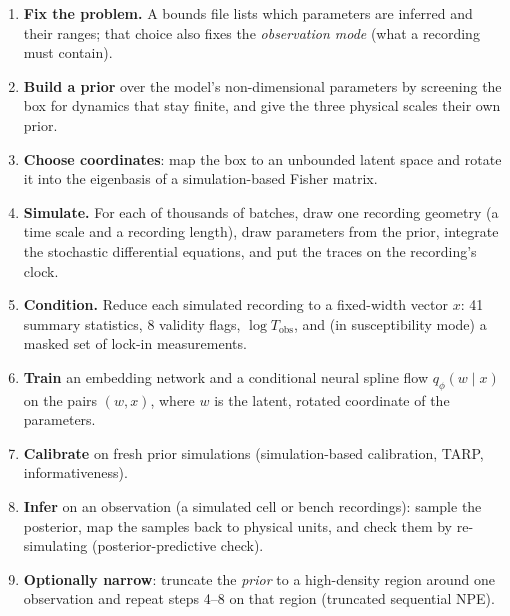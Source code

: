 \documentclass[10pt,a4paper]{article}
\newcommand{\Tobs}{T_{\mathrm{obs}}}
\begin{document}
\begin{enumerate}
  \item \textbf{Fix the problem.} A bounds file lists which parameters are inferred and their ranges; that choice
        also fixes the \emph{observation mode} (what a recording must contain).
  \item \textbf{Build a prior} over the model's non-dimensional parameters by screening the box for dynamics
        that stay finite, and give the three physical scales their own prior.
  \item \textbf{Choose coordinates}: map the box to an unbounded latent space and rotate it into the eigenbasis
        of a simulation-based Fisher matrix.
  \item \textbf{Simulate.} For each of thousands of batches, draw one recording geometry (a time scale and a
        recording length), draw parameters from the prior, integrate the stochastic differential equations, and put
        the traces on the recording's clock.
  \item \textbf{Condition.} Reduce each simulated recording to a fixed-width vector $x$: 41 summary statistics, 8
        validity flags, $\log \Tobs$, and (in susceptibility mode) a masked set of lock-in measurements.
  \item \textbf{Train} an embedding network and a conditional neural spline flow $q_\phi(w\mid x)$ on the pairs
        $(w,x)$, where $w$ is the latent, rotated coordinate of the parameters.
  \item \textbf{Calibrate} on fresh prior simulations (simulation-based calibration, TARP, informativeness).
  \item \textbf{Infer} on an observation (a simulated cell or bench recordings): sample the posterior, map the
        samples back to physical units, and check them by re-simulating (posterior-predictive check).
  \item \textbf{Optionally narrow}: truncate the \emph{prior} to a high-density region around one observation and
        repeat steps 4--8 on that region (truncated sequential NPE).
\end{enumerate}
\end{document}
